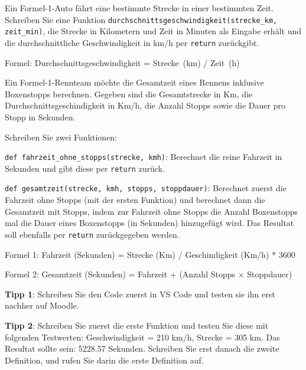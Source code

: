 \begin{myexercise}\label{ex:f1}
	Ein Formel-1-Auto fährt eine bestimmte Strecke in einer bestimmten Zeit. Schreiben Sie eine Funktion \lstinline|durchschnittsgeschwindigkeit(strecke_km, zeit_min)|, die Strecke in Kilometern und Zeit in Minuten als Eingabe erhält und die durchschnittliche Geschwindigkeit in km/h per \lstinline|return| zurückgibt.

	Formel: Durchschnittsgeschwindigkeit = Strecke (km) / Zeit (h)

	\begin{myanswer}
		
	\end{myanswer}
\end{myexercise}

\begin{myexercise}
	Ein Formel-1-Rennteam möchte die Gesamtzeit eines Rennens inklusive Boxenstopps berechnen. Gegeben sind die Gesamtstrecke in Km, die Durchschnittsgeschindigkeit in Km/h, die Anzahl Stopps sowie die Dauer pro Stopp in Sekunden.

	Schreiben Sie zwei Funktionen:

	\lstinline|def fahrzeit_ohne_stopps(strecke, kmh)|: Berechnet die reine Fahrzeit in Sekunden und gibt diese per \lstinline|return| zurück.

	\lstinline|def gesamtzeit(strecke, kmh, stopps, stoppdauer)|: Berechnet zuerst die Fahrzeit ohne Stopps (mit der ersten Funktion) und berechnet dann die Gesamtzeit mit Stopps, indem zur Fahrzeit ohne Stopps die Anzahl Boxenstopps mal die Dauer eines Boxenstopps (in Sekunden) hinzugefügt wird. Das Resultat soll ebenfalls per \lstinline|return| zurückgegeben werden.

	Formel 1: Fahrzeit (Sekunden) = Strecke (Km) / Geschindigkeit (Km/h) * 3600

	Formel 2: Gesamtzeit (Sekunden) = Fahrzeit + (Anzahl Stopps $\times$ Stoppdauer)

	\textbf{Tipp 1}: Schreiben Sie den Code zuerst in VS Code und testen sie ihn erst nachher auf Moodle.

	\textbf{Tipp 2}: Schreiben Sie zuerst die erste Funktion und testen Sie diese mit folgenden Testwerten: Geschwindigkeit = 210 km/h, Strecke = 305 km. Das Resultat sollte sein: 5228.57 Sekunden. Schreiben Sie erst danach die zweite Definition, und rufen Sie darin die erste Definition auf.

	\begin{myanswer}
		
	\end{myanswer}
\end{myexercise}

